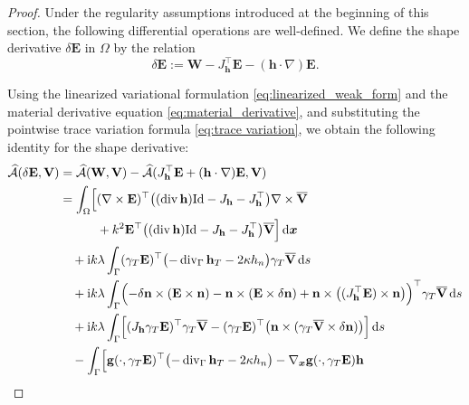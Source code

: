 \documentclass[12pt,reqno]{amsart}
\theoremstyle{definition}
\numberwithin{equation}{section}
\begin{document}
\begin{proof}
Under the regularity assumptions introduced at the beginning of this section, the following differential operations are well-defined. We define the shape derivative $\delta\mathbf{E}$ in $\Omega$ by the relation
\[
\delta\mathbf{E} := \mathbf{W} - J_{\mathbf{h}}^{\top}\mathbf{E} - (\mathbf{h} \cdot \nabla) \mathbf{E}.
\]

Using the linearized variational formulation \eqref{eq:linearized_weak_form}
and the material derivative equation \eqref{eq:material_derivative}, and
substituting the pointwise trace variation formula \eqref{eq:trace variation},
we obtain the following identity for the shape derivative:
\begin{equation}
\label{eq:shape_derivative}
\begin{aligned}
\widehat{\mathcal{A}}(\delta \mathbf{E}, \mathbf{V}) &= \widehat{\mathcal{A}}(\mathbf{W}, \mathbf{V}) - \widehat{\mathcal{A}}(J_{\mathbf{h}}^{\top}\mathbf{E} + (\mathbf{h} \cdot \nabla) \mathbf{E}, \mathbf{V}) \\
&= \int_\Omega \Bigl[ (\nabla \times \mathbf{E})^{\top} \bigl( (\operatorname{div} \mathbf{h})\mathrm{Id} - J_{\mathbf{h}} - J_{\mathbf{h}}^{\top} \bigr) \nabla \times \overline{\mathbf{V}} \\
&\qquad \quad + k^2 \mathbf{E}^{\top} \bigl( (\operatorname{div} \mathbf{h})\mathrm{Id} - J_{\mathbf{h}} - J_{\mathbf{h}}^{\top} \bigr) \overline{\mathbf{V}} \Bigr] \, \mathrm{d}\boldsymbol{x} \\
&\quad + \mathrm{i}k\lambda \int_\Gamma (\gamma_T\mathbf{E})^{\top} \bigl( -\operatorname{div}_\Gamma \mathbf{h}_T - 2\kappa h_n \bigr) \gamma_T\overline{\mathbf{V}} \, \mathrm{d}s \\
&\quad + \mathrm{i}k\lambda \int_\Gamma \Bigl( -\delta\mathbf{n} \times (\mathbf{E} \times \mathbf{n}) - \mathbf{n} \times (\mathbf{E} \times \delta \mathbf{n}) + \mathbf{n} \times \bigl( (J_{\mathbf{h}}^{\top}\mathbf{E}) \times \mathbf{n} \bigr) \Bigr)^{\top} \gamma_T\overline{\mathbf{V}} \, \mathrm{d}s \\
&\quad + \mathrm{i}k\lambda \int_\Gamma \Bigl[ (J_{\mathbf{h}}\gamma_T\mathbf{E})^{\top} \gamma_T\overline{\mathbf{V}} - (\gamma_T\mathbf{E})^{\top} \bigl( \mathbf{n} \times (\gamma_T\overline{\mathbf{V}} \times \delta \mathbf{n}) \bigr) \Bigr] \, \mathrm{d}s \\
&\quad - \int_\Gamma \Bigl[ \mathbf{g}(\cdot, \gamma_T \mathbf{E})^{\top} \bigl( -\operatorname{div}_\Gamma \mathbf{h}_T - 2\kappa h_n \bigr) - \nabla_{\boldsymbol{x}}\mathbf{g}(\cdot, \gamma_T \mathbf{E})\mathbf{h} \\

\end{aligned}
\end{equation}
\end{proof}
\end{document}
